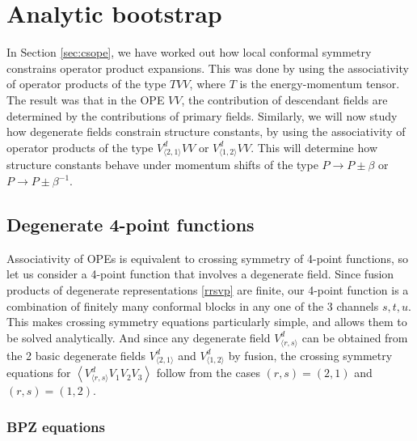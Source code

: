 \documentclass[12pt, a4paper]{article}
\theoremstyle{break}
\begin{document}
\section{Analytic bootstrap}\label{sec:ab}

In Section \ref{sec:csope}, we have worked out how local conformal symmetry constrains operator product expansions. This was done by using the associativity of operator products of the type $TVV$, where $T$ is the energy-momentum tensor. The result was that in the OPE $VV$, the contribution of descendant fields are determined by the contributions of primary fields. Similarly, we will now study how degenerate fields constrain structure constants, by using the associativity of 
operator products of the type $V^d_{\langle 2,1\rangle}VV$ or $V^d_{\langle 1,2\rangle}VV$.  
This will determine how structure constants behave under momentum shifts of the type $P\to P\pm \beta$ or $P\to P\pm \beta^{-1}$. 

\subsection{Degenerate 4-point functions}

Associativity of OPEs is equivalent to crossing symmetry of 4-point functions, so let us consider a 4-point function that involves a degenerate field. Since fusion products of degenerate representations \eqref{rrsvp} are finite, our 4-point function is a combination of finitely many conformal blocks in any one of the 3 channels $s,t,u$. This makes crossing symmetry equations particularly simple, and allows them to be solved analytically. 
And since any degenerate field $V^d_{\langle r,s\rangle}$ can be obtained from the 2 basic degenerate fields $V^d_{\langle 2,1\rangle}$ and $V^d_{\langle 1,2\rangle}$ by fusion, the crossing symmetry equations for $\left<V^d_{\langle r,s\rangle}V_1V_2V_3\right>$ follow from the cases $(r,s)=(2,1)$ and $(r,s)=(1,2)$. 

\subsubsection{BPZ equations}
\end{document}
